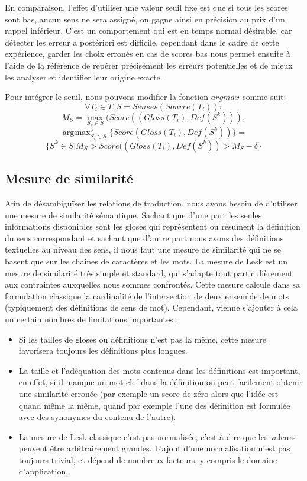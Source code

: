 \documentclass[10pt,a4paper,twoside]{article}
\DeclareMathOperator*{\argmax}{arg\!\max}
\begin{document}
En comparaison, l'effet d'utiliser une valeur seuil fixe est que si tous les scores sont bas, aucun sens ne sera assigné, on gagne ainsi en précision au prix d'un rappel inférieur. C'est un comportement qui est en temps normal désirable, car détecter les erreur a postériori est difficile, cependant dans le cadre de cette expérience, garder les choix erronés en cas de scores bas nous permet ensuite à l'aide de la référence de repérer précisément les erreurs potentielles et de mieux les analyser et identifier leur origine exacte. 

Pour intégrer le seuil, nous pouvons modifier la fonction \(argmax\) comme suit:
\[
\forall T_i \in T, S=Senses(Source(T_i)): 
\]
\[
M_S = \max_{S_k\in S}(Score((Gloss(T_i),Def(S^k))),
\]
\[
\argmax_{S_i\in S}^\delta \{Score(Gloss(T_i),Def(S^k))\}=
\]
\[
\{S^k\in S|  M_S > Score((Gloss(T_i),Def(S^k)) > M_S-\delta \}
\]

\subsection{Mesure de similarité}
Afin de désambiguïser les relations de traduction, nous avons besoin de d'utiliser une mesure de similarité sémantique. Sachant que d'une part les seules informations disponibles sont les gloses qui représentent ou résument la définition du sens correspondant et sachant que d'autre part nous avons des définitions textuelles au niveau des sens, il nous faut une mesure de similarité qui ne se basent que sur les chaines de caractères et les mots. 
La mesure de Lesk \cite{citeulike:625530} est un mesure de similarité très simple et standard, qui s'adapte tout particulièrement aux contraintes auxquelles nous sommes confrontés. Cette mesure calcule dans sa formulation classique la cardinalité de l'intersection de deux ensemble de mots (typiquement des définitions de sens de mot).
 Cependant, vienne s'ajouter à cela un certain nombres de limitations importantes :
\begin{itemize}
	\item Si les tailles de gloses ou définitions n'est pas la même, cette mesure favorisera toujours les définitions plus longues. 
	\item La taille et l'adéquation des mots contenus dans les définitions est important, en effet, si il manque un mot clef dans la définition on peut facilement obtenir une similarité erronée (par exemple un score de zéro alors que l'idée est quand même la même, quand par exemple l'une des définition est formulée avec des synonymes du contenu de l'autre).  
	\item La mesure de Lesk classique c'est pas normalisée, c'est à dire que les valeurs peuvent être arbitrairement grandes. L'ajout d'une normalisation n'est pas toujours trivial, et dépend de nombreux facteurs, y compris le domaine d'application.
\end{itemize}
 
\end{document}

